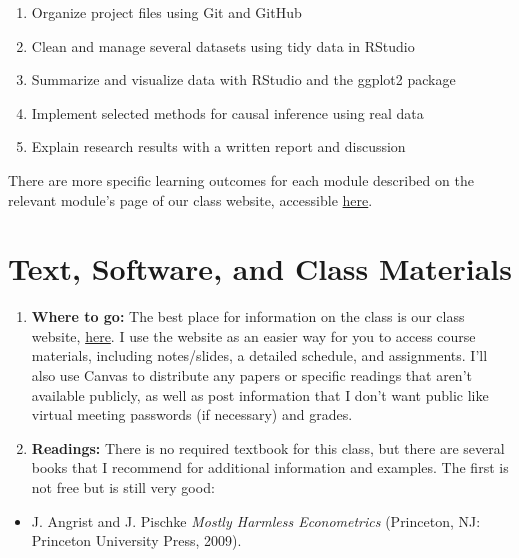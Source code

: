 \documentclass[11pt,]{article}
\providecommand{\tightlist}{%
  \setlength{\itemsep}{0pt}\setlength{\parskip}{0pt}}
\begin{document}
\begin{enumerate}
\def\labelenumi{\arabic{enumi}.}
\tightlist
\item
  Organize project files using Git and GitHub
\item
  Clean and manage several datasets using tidy data in RStudio
\item
  Summarize and visualize data with RStudio and the ggplot2 package
\item
  Implement selected methods for causal inference using real data
\item
  Explain research results with a written report and discussion
\end{enumerate}

There are more specific learning outcomes for each module described on
the relevant module's page of our class website, accessible
\href{https://econ470s23.classes.ianmccarthyecon.com/}{here}.

\hypertarget{text-software-and-class-materials}{%
\section{Text, Software, and Class
Materials}\label{text-software-and-class-materials}}

\begin{enumerate}
\def\labelenumi{\arabic{enumi}.}
\item
  \textbf{Where to go:} The best place for information on the class is
  our class website,
  \href{https://econ470s23.classes.ianmccarthyecon.com/}{here}. I use
  the website as an easier way for you to access course materials,
  including notes/slides, a detailed schedule, and assignments. I'll
  also use Canvas to distribute any papers or specific readings that
  aren't available publicly, as well as post information that I don't
  want public like virtual meeting passwords (if necessary) and grades.
\item
  \textbf{Readings:} There is no required textbook for this class, but
  there are several books that I recommend for additional information
  and examples. The first is not free but is still very good:
\end{enumerate}

\begin{itemize}
\tightlist
\item
  J. Angrist and J. Pischke \emph{Mostly {Harmless} {Econometrics}}
  (Princeton, NJ: Princeton University Press, 2009).
\end{itemize}
\end{document}
